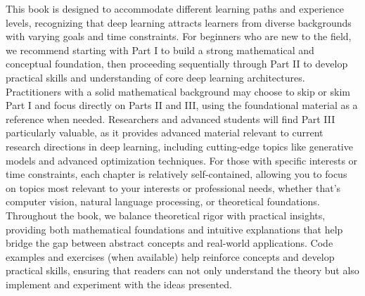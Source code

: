 This book is designed to accommodate different learning paths and experience levels, recognizing that deep learning attracts learners from diverse backgrounds with varying goals and time constraints. For beginners who are new to the field, we recommend starting with Part I to build a strong mathematical and conceptual foundation, then proceeding sequentially through Part II to develop practical skills and understanding of core deep learning architectures. Practitioners with a solid mathematical background may choose to skip or skim Part I and focus directly on Parts II and III, using the foundational material as a reference when needed. Researchers and advanced students will find Part III particularly valuable, as it provides advanced material relevant to current research directions in deep learning, including cutting-edge topics like generative models and advanced optimization techniques. For those with specific interests or time constraints, each chapter is relatively self-contained, allowing you to focus on topics most relevant to your interests or professional needs, whether that's computer vision, natural language processing, or theoretical foundations. Throughout the book, we balance theoretical rigor with practical insights, providing both mathematical foundations and intuitive explanations that help bridge the gap between abstract concepts and real-world applications. Code examples and exercises (when available) help reinforce concepts and develop practical skills, ensuring that readers can not only understand the theory but also implement and experiment with the ideas presented.
